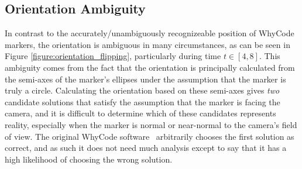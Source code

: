 \subsection{Orientation Ambiguity}

In contrast to the accurately/unambiguously recognizeable position of WhyCode markers, the orientation
is ambiguous in many circumstances, as can be seen in Figure \ref{figure:orientation_flipping},
particularly during time $t \in [4,8]$.
This ambiguity comes from the fact that the orientation is principally calculated from the semi-axes of the
marker's ellipses under the assumption that the marker is truly a circle.
Calculating the orientation based on these semi-axes gives \textit{two} candidate solutions
that satisfy the assumption that the marker is facing the camera,
and it is difficult to determine which of these candidates represents reality,
especially when the marker is normal or near-normal to the camera's field of view.
The original WhyCode software~\cite{LCAS_whycon} arbitrarily chooses the first solution as correct,
and as such it does not need much analysis except to say that it has a high likelihood of choosing the wrong solution.


